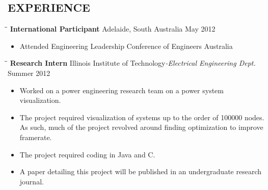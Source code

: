\documentclass{res}
\begin{document}
\begin{resume}
\section{EXPERIENCE}
   \vspace{-0.1in}	
   \begin{tabbing}
   \hspace{2.3in}\= \hspace{2.6in}\= \kill %
   {\bf International Participant}  \>Adelaide, South Australia \> May 2012\\
   \end{tabbing}\vspace{-20pt}
   \begin{itemize}
       \item Attended Engineering Leadership Conference of Engineers Australia
   \end{itemize}

   \begin{tabbing}
   \hspace{1.3in}\= \hspace{3.6in}\= \kill %
    {\bf Research Intern} \>Illinois Institute of Technology\emph{\small{-Electrical Engineering Dept.}} \>Summer 2012\\
   \end{tabbing}\vspace{-20pt}
   \begin{itemize}
     \item Worked on a power engineering research team on a power system visualization. 
     \item The project required visualization of systems up to the order of 100000 nodes. As such, much of the project revolved around finding optimization to improve framerate.
     \item The project required coding in Java and C.
     \item A paper detailing this project will be published in an undergraduate research journal.
   \end{itemize}


\end{resume}
\end{document}
